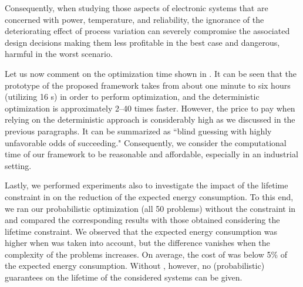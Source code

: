 Consequently, when studying those aspects of electronic systems that are
concerned with power, temperature, and reliability, the ignorance of the
deteriorating effect of process variation can severely compromise the associated
design decisions making them less profitable in the best case and dangerous,
harmful in the worst scenario.

Let us now comment on the optimization time shown in . It can
be seen that the prototype of the proposed framework takes from about one minute
to six hours (utilizing 16 s) in order to perform optimization, and
the deterministic optimization is approximately 2--40 times faster. However, the
price to pay when relying on the deterministic approach is considerably high as
we discussed in the previous paragraphs. It can be summarized as ``blind
guessing with highly unfavorable odds of succeeding." Consequently, we consider
the computational time of our framework to be reasonable and affordable,
especially in an industrial setting.

Lastly, we performed experiments also to investigate the impact of the lifetime
constraint in  on the reduction of the expected
energy consumption. To this end, we ran our probabilistic optimization (all 50
problems) without the constraint in  and compared
the corresponding results with those obtained considering the lifetime
constraint. We observed that the expected energy consumption was higher when
 was taken into account, but the difference
vanishes when the complexity of the problems increases. On average, the cost of
 was below 5\% of the expected energy consumption.
Without , however, no (probabilistic) guarantees on
the lifetime of the considered systems can be given.
